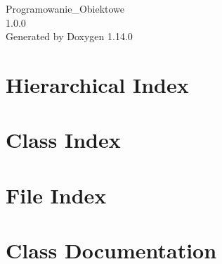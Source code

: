 \documentclass[twoside]{book}
\newcommand{\+}{\discretionary{\mbox{\scriptsize$\hookleftarrow$}}{}{}}
\newcommand{\clearemptydoublepage}{%
    \newpage{\pagestyle{empty}\cleardoublepage}%
  }
\begin{document}
  \raggedbottom
    \hypersetup{pageanchor=false,
                bookmarksnumbered=true,
                pdfencoding=unicode
               }
  \begin{titlepage}
  \vspace*{7cm}
  \begin{center}%
  {\Large Programowanie\+\_\+\+Obiektowe}\\
  [1ex]\large 1.\+0.\+0 \\
  \vspace*{1cm}
  {\large Generated by Doxygen 1.14.0}\\
  \end{center}
  \end{titlepage}
  \clearemptydoublepage
  \tableofcontents
  \clearemptydoublepage
  \hypersetup{pageanchor=true}
\chapter{Hierarchical Index}

\chapter{Class Index}

\chapter{File Index}

\chapter{Class Documentation}





















\end{document}
